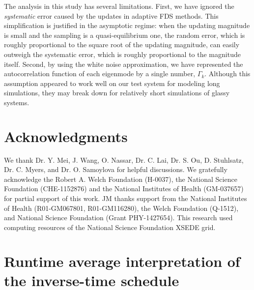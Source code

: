 \documentclass[reprint, superscriptaddress, floatfix]{revtex4-1}
\begin{document}
The analysis in this study has several limitations.
%
First, we have ignored the \emph{systematic}
error\cite{zhou2005, morozov2007, zhou2008}
caused by the updates in adaptive FDS methods.
%
This simplification is justified in the asymptotic regime:
when the updating magnitude is small
and the sampling is a quasi-equilibrium one\cite{
  zhou2005, morozov2007, zhou2008, barducci2008, dama2014},
the random error,
which is roughly proportional to
the square root of the updating magnitude\cite{
  zhou2005, morozov2007, zhou2008, bussi2006},
can easily outweigh
the systematic error,
which is roughly proportional to
the magnitude itself\cite{morozov2007}.
%
%
Second, by using the white noise approximation,
we have represented the autocorrelation function
of each eigenmode by a single number, $\Gamma_k$.
%
Although this assumption appeared to work well
on our test system for modeling long simulations,
they may break down for relatively short simulations
of glassy systems.


\section{Acknowledgments}

We thank Dr. Y. Mei, J. Wang,
O. Nassar, Dr. C. Lai, Dr. S. Ou, D. Stuhlsatz,
Dr. C. Myers, and Dr. O. Samoylova
for helpful discussions.
%
We gratefully acknowledge the Robert A. Welch Foundation (H-0037),
the National Science Foundation (CHE-1152876)
and the National Institutes of Health (GM-037657)
for partial support of this work.
%
JM thanks support from the National Institutes of Health (R01-GM067801, R01-GM116280),
the Welch Foundation (Q-1512),
and National Science Foundation (Grant PHY-1427654).
%
This research used computing resources of the National Science Foundation XSEDE grid.
%
%


\appendix




\section{\label{sec:equilerr}
Runtime average interpretation
of the inverse-time schedule
}
\end{document}

